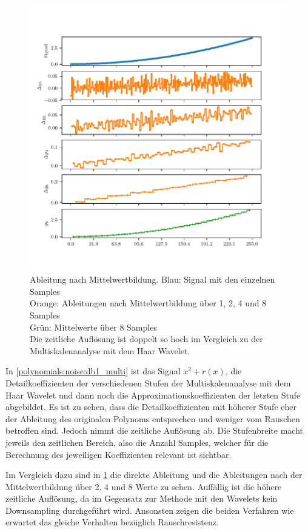 \begin{refsection}
\begin{figure}
    \includegraphics{papers/polynomials/images/polynomials_noise_moving_average.pdf}
    \caption{Ableitung nach Mittelwertbildung.
        Blau: Signal mit den einzelnen Samples\\
        Orange: Ableitungen nach Mittelwertbildung über 1, 2, 4 und 8 Samples\\
        Grün: Mittelwerte über 8 Samples\\
        Die zeitliche Auflösung ist doppelt so hoch im Vergleich zu der
        Multiskalenanalyse mit dem Haar Wavelet.\label{polynomials:noise:average}}
\end{figure}
In \cref{polynomials:noise:db1_multi} ist das Signal $x^2 + r(x)$, die
Detailkoeffizienten der verschiedenen Stufen der Multiskalenanalyse mit dem
Haar Wavelet und dann noch die Approximationskoeffizienten der letzten Stufe
abgebildet. Es ist zu sehen, dass die Detailkoeffizienten mit höherer Stufe
eher der Ableitung des originalen Polynoms entsprechen und weniger vom Rauschen
betroffen sind. Jedoch nimmt die zeitliche Auflösung ab.
Die Stufenbreite macht jeweils den zeitlichen Bereich, also die Anzahl Samples,
welcher für die Berechnung des jeweiligen Koeffizienten relevant ist sichtbar.

Im Vergleich dazu sind in \cref{polynomials:noise:average} die direkte
Ableitung und die Ableitungen nach der Mittelwertbildung über 2, 4 und 8 Werte
zu sehen. Auffällig ist die höhere zeitliche Auflösung, da im Gegensatz zur
Methode mit den Wavelets kein Downsampling durchgeführt wird. Ansonsten zeigen
die beiden Verfahren wie erwartet das gleiche Verhalten bezüglich
Rauschresistenz.


\end{refsection}

